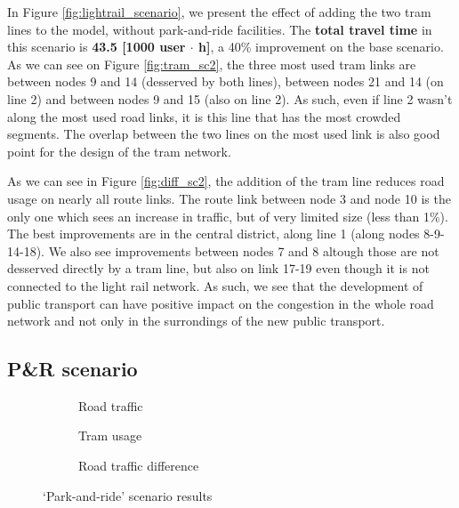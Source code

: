 In Figure \ref{fig:lightrail_scenario}, we present the effect of adding the two tram lines to the model, without park-and-ride facilities. The \textbf{total travel time} in this scenario is \textbf{43.5 [1000 user $\cdot$ h]}, a 40\% improvement on the base scenario. As we can see on Figure \ref{fig:tram_sc2}, the three most used tram links are between nodes 9 and 14 (desserved by both lines), between nodes 21 and 14 (on line 2) and between nodes 9 and 15 (also on line 2). As such, even if line 2 wasn't along the most used road links, it is this line that has the most crowded segments. The overlap between the two lines on the most used link is also good point for the design of the tram network.

As we can see in Figure \ref{fig:diff_sc2}, the addition of the tram line reduces road usage on nearly all route links. The route link between node 3 and node 10 is the only one which sees an increase in traffic, but of very limited size (less than 1\%). The best improvements are in the central district, along line 1 (along nodes 8-9-14-18). We also see improvements between nodes 7 and 8 altough those are not desserved directly by a tram line, but also on link 17-19 even though it is not connected to the light rail network. As such, we see that the development of public transport can have positive impact on the congestion in the whole road network and not only in the surrondings of the new public transport.

\subsection{P\&R scenario}

\begin{figure}
    \centering
    \begin{subfigure}{0.33\textwidth}
        \centering
        \resizebox{\textwidth}{!}{}
        \caption{Road traffic}
    \end{subfigure}%
    \begin{subfigure}{0.33\textwidth}
        \centering
        \resizebox{\textwidth}{!}{}
        \caption{Tram usage}
        \label{fig:tram_sc3}
    \end{subfigure}%
    \begin{subfigure}{0.33\textwidth}
        \centering
        \resizebox{\textwidth}{!}{}
        \caption{Road traffic difference}
        \label{fig:diff_sc3}
    \end{subfigure}
    \caption{`Park-and-ride' scenario results}
    \label{fig:pnr_scenario}
\end{figure}

